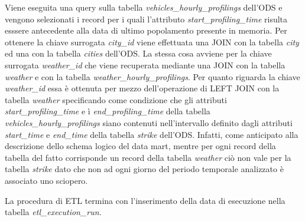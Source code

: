 Viene eseguita una query sulla tabella \textit{vehicles\_hourly\_profilings}
dell'ODS e vengono selezionati i record per i quali l'attributo
\textit{start\_profiling\_time} risulta esssere antecedente alla data di ultimo
popolamento presente in memoria. Per ottenere la chiave surrogata \textit{city\_id}
viene effettuata una JOIN con la tabella \textit{city} ed una con la tabella
\textit{cities} dell'ODS. La stessa cosa avviene per la chiave surrogata
\textit{weather\_id} che viene recuperata mediante una JOIN con la tabella
\textit{weather} e con la tabella \textit{weather\_hourly\_profilings}.
Per quanto riguarda la chiave \textit{weather\_id} essa è ottenuta per mezzo
dell'operazione di LEFT JOIN con la tabella \textit{weather} specificando
come condizione che gli attributi \textit{start\_profiling\_time} e ì
\textit{end\_profiling\_time} della tabella \textit{vehicles\_hourly\_profilings}
siano contenuti nell'intervallo definito dagli attributi \textit{start\_time} e
\textit{end\_time} della tabella \textit{strike} dell'ODS. Infatti, come anticipato
alla descrizione dello schema logico del data mart, mentre per ogni record della
tabella del fatto corrisponde un record della tabella \textit{weather} ciò non
vale per la tabella \textit{strike} dato che non ad ogni giorno del periodo
temporale analizzato è associato uno sciopero.

La procedura di ETL termina con l'inserimento della data di esecuzione nella
tabella \textit{etl\_execution\_run}.
